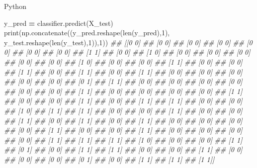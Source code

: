 \documentclass[
]{book}
\newenvironment{Shaded}{\begin{snugshade}}{\end{snugshade}}
\newcommand{\BuiltInTok}[1]{#1}
\newcommand{\CommentTok}[1]{\textcolor[rgb]{0.56,0.35,0.01}{\textit{#1}}}
\newcommand{\DecValTok}[1]{\textcolor[rgb]{0.00,0.00,0.81}{#1}}
\newcommand{\NormalTok}[1]{#1}
\newcommand{\OperatorTok}[1]{\textcolor[rgb]{0.81,0.36,0.00}{\textbf{#1}}}
\theoremstyle{definition}
\theoremstyle{definition}
\theoremstyle{definition}
\theoremstyle{definition}
\theoremstyle{remark}
\begin{document}
Python

\begin{Shaded}
\begin{Highlighting}[]
\NormalTok{y\_pred }\OperatorTok{=}\NormalTok{ classifier.predict(X\_test)}
\BuiltInTok{print}\NormalTok{(np.concatenate((y\_pred.reshape(}\BuiltInTok{len}\NormalTok{(y\_pred),}\DecValTok{1}\NormalTok{), y\_test.reshape(}\BuiltInTok{len}\NormalTok{(y\_test),}\DecValTok{1}\NormalTok{)),}\DecValTok{1}\NormalTok{))}
\CommentTok{\#\# [[0 0]}
\CommentTok{\#\#  [0 0]}
\CommentTok{\#\#  [0 0]}
\CommentTok{\#\#  [0 0]}
\CommentTok{\#\#  [0 0]}
\CommentTok{\#\#  [0 0]}
\CommentTok{\#\#  [0 0]}
\CommentTok{\#\#  [1 1]}
\CommentTok{\#\#  [0 0]}
\CommentTok{\#\#  [1 0]}
\CommentTok{\#\#  [0 0]}
\CommentTok{\#\#  [0 0]}
\CommentTok{\#\#  [0 0]}
\CommentTok{\#\#  [0 0]}
\CommentTok{\#\#  [0 0]}
\CommentTok{\#\#  [1 0]}
\CommentTok{\#\#  [0 0]}
\CommentTok{\#\#  [0 0]}
\CommentTok{\#\#  [1 1]}
\CommentTok{\#\#  [0 0]}
\CommentTok{\#\#  [0 0]}
\CommentTok{\#\#  [1 1]}
\CommentTok{\#\#  [0 0]}
\CommentTok{\#\#  [1 1]}
\CommentTok{\#\#  [0 0]}
\CommentTok{\#\#  [1 1]}
\CommentTok{\#\#  [0 0]}
\CommentTok{\#\#  [0 0]}
\CommentTok{\#\#  [0 0]}
\CommentTok{\#\#  [0 0]}
\CommentTok{\#\#  [0 0]}
\CommentTok{\#\#  [0 1]}
\CommentTok{\#\#  [1 1]}
\CommentTok{\#\#  [0 0]}
\CommentTok{\#\#  [0 0]}
\CommentTok{\#\#  [0 0]}
\CommentTok{\#\#  [0 0]}
\CommentTok{\#\#  [0 0]}
\CommentTok{\#\#  [0 0]}
\CommentTok{\#\#  [1 1]}
\CommentTok{\#\#  [0 0]}
\CommentTok{\#\#  [0 0]}
\CommentTok{\#\#  [0 0]}
\CommentTok{\#\#  [0 0]}
\CommentTok{\#\#  [1 1]}
\CommentTok{\#\#  [0 0]}
\CommentTok{\#\#  [0 0]}
\CommentTok{\#\#  [1 1]}
\CommentTok{\#\#  [0 0]}
\CommentTok{\#\#  [1 1]}
\CommentTok{\#\#  [1 1]}
\CommentTok{\#\#  [0 0]}
\CommentTok{\#\#  [0 0]}
\CommentTok{\#\#  [1 0]}
\CommentTok{\#\#  [1 1]}
\CommentTok{\#\#  [1 1]}
\CommentTok{\#\#  [0 0]}
\CommentTok{\#\#  [0 0]}
\CommentTok{\#\#  [1 1]}
\CommentTok{\#\#  [0 0]}
\CommentTok{\#\#  [0 0]}
\CommentTok{\#\#  [1 1]}
\CommentTok{\#\#  [0 0]}
\CommentTok{\#\#  [1 1]}
\CommentTok{\#\#  [0 0]}
\CommentTok{\#\#  [1 1]}
\CommentTok{\#\#  [0 0]}
\CommentTok{\#\#  [0 0]}
\CommentTok{\#\#  [0 0]}
\CommentTok{\#\#  [0 0]}
\CommentTok{\#\#  [1 1]}
\CommentTok{\#\#  [0 0]}
\CommentTok{\#\#  [0 0]}
\CommentTok{\#\#  [1 1]}
\CommentTok{\#\#  [0 0]}
\CommentTok{\#\#  [0 0]}
\CommentTok{\#\#  [0 0]}
\CommentTok{\#\#  [0 0]}
\CommentTok{\#\#  [1 1]}
\CommentTok{\#\#  [1 1]}
\CommentTok{\#\#  [1 1]}
\CommentTok{\#\#  [1 0]}
\CommentTok{\#\#  [0 0]}
\CommentTok{\#\#  [0 0]}
\CommentTok{\#\#  [1 1]}
\CommentTok{\#\#  [0 1]}
\CommentTok{\#\#  [0 0]}
\CommentTok{\#\#  [1 1]}
\CommentTok{\#\#  [1 1]}
\CommentTok{\#\#  [0 0]}
\CommentTok{\#\#  [0 0]}
\CommentTok{\#\#  [1 1]}
\CommentTok{\#\#  [0 0]}
\CommentTok{\#\#  [0 0]}
\CommentTok{\#\#  [0 0]}
\CommentTok{\#\#  [0 1]}
\CommentTok{\#\#  [0 0]}
\CommentTok{\#\#  [1 1]}
\CommentTok{\#\#  [1 1]}
\CommentTok{\#\#  [1 1]]}
\end{Highlighting}
\end{Shaded}
\end{document}
